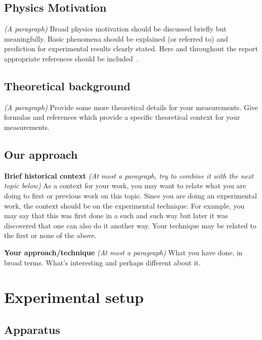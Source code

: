 \documentclass[11pt,letterpaper,onecolumn]{article}
\begin{document}
\subsection{Physics Motivation}

{\it (A paragraph)} Broad physics motivation should be discussed briefly but
meaningfully. Basic phenomena should be
explained (or referred to) and 
prediction for experimental results clearly
stated. Here and throughout the report appropriate
references should be included~\cite{book, article}.

\subsection{Theoretical background}

{\it (A paragraph)}  Provide some more theoretical details for your measurements.
Give formulas and references which provide a specific theoretical
context for your measurements.

\subsection{Our approach}

{\bf Brief historical context}
{\it (At most a paragraph, try to combine it with the next topic below)} 
As a context for your work,
you may want to relate what you are doing to first or previous 
work on this topic. Since you are doing an experimental work,
the context should be on the experimental technique. For example,
you may say that this was first done in a such and such way 
but later it was discovered
that one can also do it another way. Your technique may be
related to the first or none of the above.

\noindent
{\bf Your approach/technique}
{\it (At most a paragraph)}
What you have done, in broad terms. What's interesting and perhaps
different about it.


\section{Experimental setup} 

\subsection{Apparatus} 
\end{document}
